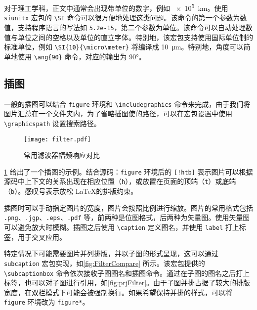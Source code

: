 对于理工学科，正文中通常会出现带单位的数字，例如 \SI{e5}{km}。使用 \verb|siunitx| 宏包的 \verb|\SI| 命令可以很方便地处理这类问题。该命令的第一个参数为数值，支持程序语言的写法如 \verb|5.2e-15|，第二个参数为单位。该命令可以自动处理数值与单位之间的空格以及单位的直立字体。特别地，该宏包支持使用国际单位制的标准单位，例如 \verb|\SI{10}{\micro\meter}| 将编译成 \SI{10}{\micro\meter}。特别地，角度可以简单地使用 \verb|\ang{90}| 命令，对应的输出为 \ang{90}。


\subsection{插图} \label{subsec:figures}

一般的插图可以结合 \verb|figure| 环境和 \verb|\includegraphics| 命令来完成，由于我们将图片汇总在一个文件夹内，为了省略插图使的路径，可以在宏包设置中使用 \verb|\graphicspath| 设置搜索路径。


\begin{figure}[!htb]
    \centering
    \texttt{[image: filter.pdf]}
    \caption{常用滤波器幅频响应对比}
    \label{fig:filter}
\end{figure}


\cref{fig:filter} 给出了一个插图的示例。结合源码：\verb|figure| 环境后的 \verb|[!htb]| 表示图片可以根据源码中上下文的关系出现在相应位置（\verb|h|），或放置在页面的顶端（\verb|t|）或底端（\verb|b|）。感叹号表示放松 \LaTeX 的排版约束。


插图时可以手动指定图片的宽度，图片会按照比例进行缩放。图片的常用格式包括 \verb|.png|、\verb|.jgp|、\verb|.eps|、\verb|.pdf| 等，前两种是位图格式，后两种为矢量图。使用矢量图可以避免放大时模糊。插图之后使用 \verb|\caption| 定义图名，并使用 \verb|label| 打上标签，用于交叉应用。


特定情况下可能需要图片并列排版，并以子图的形式呈现，这可以通过 \verb|subcaption| 宏包实现，如\cref{fig:FilterCompare} 所示。该宏包提供的 \verb|\subcaptionbox| 命令依次接收子图图名和插图命令。通过在子图的图名之后打上标签，也可以对子图进行引用，如\cref{fig:prjFilter}。由于子图并排占据了较大的排版宽度，在双栏模式下可能会被强制换行。如果希望保持并排的样式，可以将 \verb|figure| 环境改为 \verb|figure*|。


\begin{figure*}[!htb]
    \centering
    \hspace{5mm}
    \caption{滤波器幅频响应与滤波效果对比}
    \label{fig:FilterCompare}
\end{figure*}


